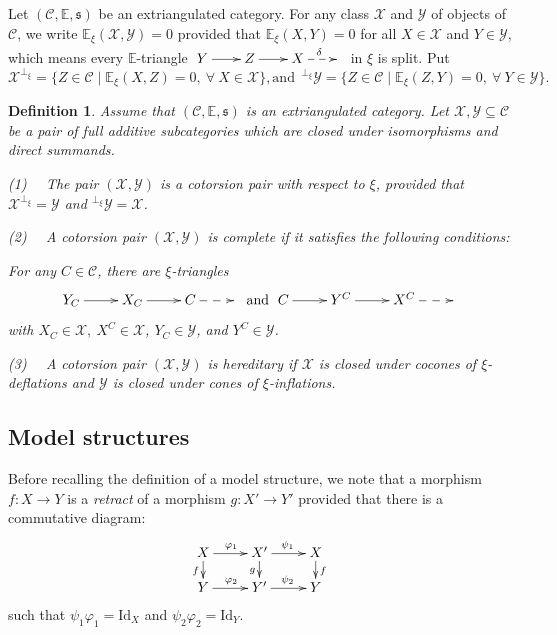 \documentclass[11pt,a4paper]{amsart}
\numberwithin{equation}{section}
\theoremstyle{plain}
\newtheorem{definition}[thm]{Definition}
\begin{document}
	Let $(\mathscr{C}, \mathbb{E},\mathfrak{s})$ be an extriangulated category. For any class $\mathcal{X}$ and $\mathcal{Y}$ of objects of $\mathscr{C}$, we write $\mathbb{E}_{\xi}(\mathcal{X}, \mathcal{Y})=0$ provided that $\mathbb{E}_{\xi}(X, Y)=0$ for all $X\in\mathcal{X}$ and $Y\in\mathcal{Y}$, which means every $\mathbb{E}$-triangle  $\xymatrix@C=2em{Y\ar[r]&Z\ar[r]&X\ar@{-->}[r]^{\delta}&}$ in $\xi$  is split. Put
$$\mathcal{X}^{\perp_\xi}=\{Z\in\mathcal{C}\mid \mathbb{E}_{\xi}(X, Z)=0, \ \forall \ X\in\mathcal{X}\},  \mbox{and} \ \ ^{\perp_\xi}\mathcal{Y}=\{Z\in\mathcal{C}\mid \mathbb{E}_{\xi}(Z, Y)=0, \ \forall \ Y\in\mathcal{Y}\}.$$
\begin{definition} {\rm Assume that $(\mathscr{C}, \mathbb{E},\mathfrak{s})$ is an extriangulated category. Let $\mathcal{X},\mathcal{Y}\subseteq\mathscr{C}$ be a pair of full additive subcategories which are closed under isomorphisms and direct summands.
		
		(1) \ \ The pair $(\mathcal{X, Y})$ is  a {\it cotorsion pair} with respect to $\xi$, provided that $\mathcal{X}^{\perp_\xi}=\mathcal{Y}$ and $^{\perp_\xi}\mathcal{Y}=\mathcal{X}$.
		
		(2) \ \ A  cotorsion pair $(\mathcal{X}, \mathcal{Y})$ is  {\it complete} if it satisfies the following conditions:
		
		For any $C\in\mathcal{C}$, there are ${\xi}$-triangles
		$$\xymatrix{Y_C\ar[r]&X_C\ar[r]&C\ar@{-->}[r]&}~ \textrm{and} ~\xymatrix{C\ar[r]&Y^C\ar[r]&X^C\ar@{-->}[r]&}$$
		\noindent with $X_C\in\mathcal{X}, \ X^C\in\mathcal{X}$,  $Y_C\in\mathcal{Y}$, and $Y^C\in\mathcal{Y}$.
		
		(3) \ \ A cotorsion pair $(\mathcal{X}, \mathcal{Y})$ is  \emph{hereditary} if $\mathcal{X}$ is closed under cocones of $\xi$-deflations and $\mathcal{Y}$ is closed under cones of $\xi$-inflations.
		\vspace{1mm}}
\end{definition}
\subsection{Model structures} 
Before recalling the definition of a model structure, we note that a morphism $f:X\longrightarrow Y$ is a \emph{retract} of a morphism $g:X'\longrightarrow Y'$ provided that there is a commutative diagram:
\[\xymatrix@R=0.4cm{
	X \ar[r]^{\varphi_1} \ar[d]_{f} & X' \ar[r]^{\psi_1} \ar[d]_{g} & X \ar[d]^{f} \\ 
	Y \ar[r]^{\varphi_2} & Y' \ar[r]^{\psi_2}& Y
}\]
such that $\psi_1\varphi_1=\mathrm{Id}_X$ and $\psi_2\varphi_2=\mathrm{Id}_Y$.
\end{document}
